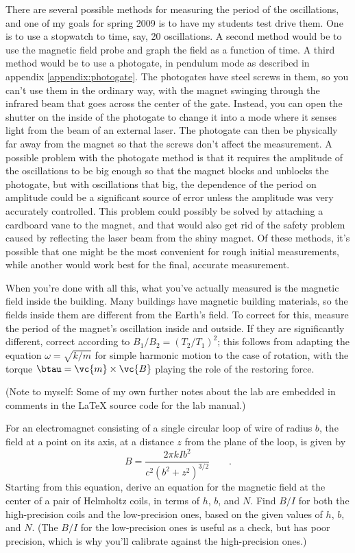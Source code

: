There are several possible methods for measuring the period of the oscillations, and one of my goals for
spring 2009 is to have my students test drive them. One is to use
a stopwatch to time, say, 20 oscillations.  A second method would be to use the magnetic field probe and graph the field as a function
of time.
A third method would be to use a photogate, in pendulum mode as described in appendix \ref{appendix:photogate}.
The photogates have steel screws in them, so you can't use them in the ordinary way, with the magnet swinging
through the infrared beam that goes across the center of the gate. Instead, you can open the shutter on
the inside of the photogate to change it into a mode where it senses light from the beam of an external
laser. The photogate can then be physically far away from the magnet so that the screws don't affect
the measurement. A possible problem with the photogate method is that it requires the amplitude of the oscillations to
be big enough so that the magnet blocks and unblocks the photogate, but with oscillations that big, the
dependence of the period on amplitude could be a significant source of error unless the amplitude was very
accurately controlled. This problem could possibly be solved by attaching a cardboard vane to the magnet, and
that would also get rid of the safety problem caused by reflecting the laser beam from the shiny magnet.
Of these methods, it's possible that one might be the most convenient for rough initial measurements, while
another would work best for the final, accurate measurement.

When you're done with all this, what you've actually measured is the magnetic field inside the
building. Many buildings have magnetic building materials, so the fields inside them are different
from the Earth's field. To correct for this, measure the period of the magnet's oscillation inside
and outside. If they are significantly different, correct according to $B_1/B_2=(T_2/T_1)^2$; this
follows from adapting the equation $\omega=\sqrt{k/m}$ for simple harmonic motion to the case of
rotation, with the torque $\btau=\vc{m}\times\vc{B}$ playing the role of the restoring force.

(Note to myself: Some of my own further notes about the lab are embedded in comments in the LaTeX source code
for the lab manual.)

\prelab

\prelabquestion  For an electromagnet consisting of a single circular
loop of wire of radius $b$, the field at a point on its
axis, at a distance $z$ from the plane of the loop, is given by
\begin{equation*}
      B = \frac{2\pi kIb^2}{ c^2( b^2+ z^2)^{3/2}} \qquad .
\end{equation*}
Starting from this equation, derive an equation for the
magnetic field at the center of a pair of Helmholtz coils, in terms of $h$, $b$, and $N$.
Find $B/I$ for both the high-precision coils and the low-precision ones, based on the
given values of $h$, $b$, and $N$. (The $B/I$ for the low-precision ones is useful as a check,
but has poor precision, which is why you'll calibrate against the high-precision ones.)

